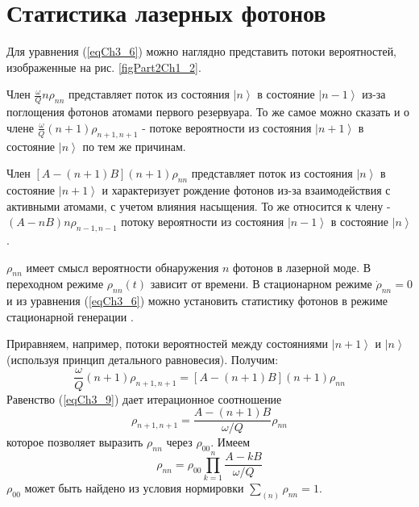 \section{Статистика лазерных фотонов}
Для уравнения (\ref{eqCh3_6}) можно наглядно представить потоки
вероятностей, изображенные на рис. \ref{figPart2Ch1_2}. 



Член $\frac{\omega}{Q} n \rho_{nn}$ представляет поток из состояния
$\left|n\right>$ в состояние $\left|n - 1\right>$ из-за 
поглощения фотонов атомами первого резервуара. То же самое можно
сказать и о члене $\frac{\omega}{Q} \left(n + 1\right) \rho_{n + 1, n
  + 1}$ - потоке вероятности из состояния $\left|n + 1\right>$ в состояние
$\left|n\right>$ по тем же причинам. 

Член $\left[A - \left(n + 1\right) B\right]\left(n + 1\right)
\rho_{nn}$ представляет поток из 
состояния $\left|n\right>$ в состояние  
$\left|n + 1\right>$ и характеризует рождение фотонов из-за
взаимодействия с активными атомами, с учетом влияния насыщения. То же
относится к члену   - $\left(A - n B\right)n \rho_{n - 1, n - 1}$
потоку вероятности из состояния $\left|n - 1\right>$ в состояние
$\left|n\right>$.  

$\rho_{nn}$ имеет смысл вероятности обнаружения $n$ фотонов в лазерной
моде. В переходном режиме $\rho_{nn}\left(t\right)$ зависит от
времени. В стационарном режиме $\dot{\rho}_{nn} = 0$
и из уравнения (\ref {eqCh3_6}) можно установить статистику фотонов в режиме
стационарной генерации \cite{bScally1974}. 

Приравняем, например, потоки вероятностей между состояниями 
$\left|n + 1\right>$ и $\left|n\right>$
(используя принцип детального равновесия). Получим: 
\begin{equation}
\frac{\omega}{Q}\left(n + 1\right)\rho_{n + 1, n + 1} =
\left[A - \left(n + 1\right)B\right]\left(n + 1\right)\rho_{nn}
\label{eqCh3_9}
\end{equation}
Равенство (\ref{eqCh3_9}) дает итерационное соотношение
\begin{equation}
\rho_{n + 1, n + 1} = 
\frac{A - \left(n + 1\right)B}{\omega/Q} \rho_{nn}
\label{eqCh3_10}
\end{equation}
которое позволяет выразить $\rho_{nn}$ через $\rho_{00}$.  Имеем
\begin{equation}
\rho_{nn} = \rho_{00}\prod_{k = 1}^n
\frac{A - k B}{\omega/Q} 
\label{eqCh3_11}
\end{equation}
$\rho_{00}$ может быть найдено из условия нормировки
$\sum_{(n)}\rho_{nn} = 1$.

